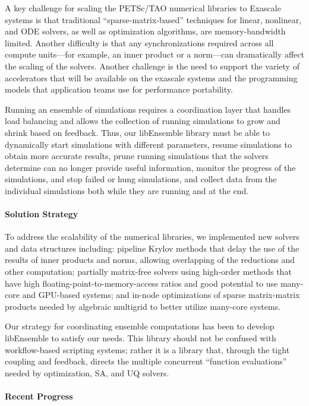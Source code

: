 A key challenge for scaling the PETSc/TAO numerical libraries to Exascale systems is that traditional 
``sparse-matrix-based'' techniques for linear, nonlinear, and ODE solvers, as well as optimization 
algorithms, are memory-bandwidth limited.  Another difficulty is that any synchronizations 
required across all compute units---for example, an inner product or a norm---can 
dramatically affect the scaling of the solvers.  Another challenge is the need to
support the variety of accelerators that will be available on the exascale systems
and the programming models that application teams use for performance
portability.

Running an ensemble of simulations requires a coordination layer that handles load balancing and
allows the collection of running simulations to grow and shrink based on feedback. Thus, our
libEnsemble library must be able to dynamically start simulations with different parameters, 
resume simulations to obtain more accurate results, prune running simulations that the solvers 
determine can no longer provide useful information, monitor the progress of the simulations, 
and stop failed or hung simulations, and collect data from the individual simulations both 
while they are running and at the end.

\paragraph{Solution Strategy}

To address the scalability of the numerical libraries, we implemented new solvers and data 
structures including: pipeline Krylov methods that delay the use of the results of inner 
products and norms, allowing overlapping of the reductions and other computation; partially 
matrix-free solvers using high-order methods that have high floating-point-to-memory-access 
ratios and good potential to use many-core and GPU-based systems; and in-node optimizations 
of sparse matrix-matrix products needed by algebraic multigrid to better utilize many-core 
systems.

Our strategy for coordinating ensemble computations has been to develop libEnsemble
to satisfy our needs.  This library should not be confused with workflow-based 
scripting systems; rather it is a library that, through the tight coupling and 
feedback, directs the multiple concurrent ``function evaluations'' needed by 
optimization, SA, and UQ solvers.

\paragraph{Recent Progress}

